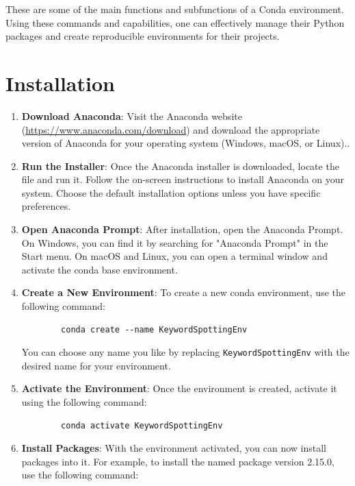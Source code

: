 These are some of the main functions and subfunctions of a Conda environment. Using these commands and capabilities, one can effectively manage their Python packages and create reproducible environments for their projects.


\section{Installation}

\begin{enumerate}
	\item \textbf{Download Anaconda}: Visit the Anaconda website (\url{https://www.anaconda.com/download}) and download the appropriate version of Anaconda for your operating system (Windows, macOS, or Linux)..
	
	\item \textbf{Run the Installer}: Once the Anaconda installer is downloaded, locate the file and run it. Follow the on-screen instructions to install Anaconda on your system. Choose the default installation options unless you have specific preferences.
	
	\item \textbf{Open Anaconda Prompt}: After installation, open the Anaconda Prompt. On Windows, you can find it by searching for "Anaconda Prompt" in the Start menu. On macOS and Linux, you can open a terminal window and activate the conda base environment.
	
	\item \textbf{Create a New Environment}: To create a new conda environment, use the following command:
	
	\begin{verbatim}
		conda create --name KeywordSpottingEnv
	\end{verbatim}
	
	You can choose any name you like by replacing \texttt{KeywordSpottingEnv} with the desired name for your environment.
	
	\item \textbf{Activate the Environment}: Once the environment is created, activate it using the following command:
	
	\begin{verbatim}
		conda activate KeywordSpottingEnv
	\end{verbatim}
	
	
	\item \textbf{Install Packages}: With the environment activated, you can now install packages into it. For example, to install the  named  package version 2.15.0, use the following command:
	

\end{enumerate}
